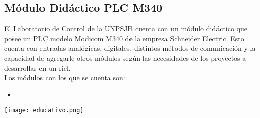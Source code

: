 

\subsection{Módulo Didáctico PLC M340} \label{sec:didac}

El Laboratorio de Control de la UNPSJB cuenta con un módulo didáctico que posee un PLC modelo Modicom M340 de la empresa Schneider Electric. Esto cuenta con entradas analógicas, digitales, distintos métodos de comunicación y la capacidad de agregarle otros módulos según las necesidades de los proyectos a desarrollar en un riel.  \\
Los módulos con los que se cuenta son:
\begin{itemize}
	\item 
\end{itemize}
\begin{center}
	\texttt{[image: educativo.png]}
	\label{fig:didac}
\end{center}




